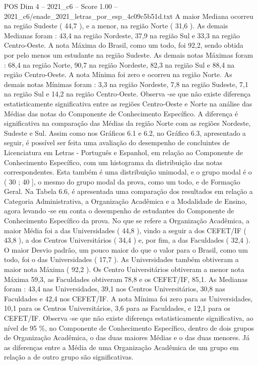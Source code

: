 \begin{textsample}{POS Dim 4 – 2021\_c6 – Score 1.00 – 2021\_c6/enade\_2021\_letras\_por\_esp\_4c09c5b51d.txt}
A maior Mediana ocorreu na região Sudeste ( 44,7 ), e a menor, na região Norte ( 31,6 ).
As demais Medianas foram : 43,4 na região Nordeste, 37,9 na região Sul e 33,3 na região Centro-Oeste.
A nota Máxima do Brasil, como um todo, foi 92,2, sendo obtida por pelo menos um estudante na região Sudeste.
As demais notas Máximas foram : 68,4 na região Norte, 90,7 na região Nordeste, 82,3 na região Sul e 88,4 na região Centro-Oeste.
A nota Mínima foi zero e ocorreu na região Norte.
As demais notas Mínimas foram : 3,3 na região Nordeste, 7,8 na região Sudeste, 7,1 na região Sul e 14,2 na região Centro-Oeste.
Observa -se que não existe diferença estatisticamente significativa entre as regiões Centro-Oeste e Norte na análise das Médias das notas do Componente de Conhecimento Específico.
A diferença é significativa na comparação das Médias da região Norte com as regiões Nordeste, Sudeste e Sul.
Assim como nos Gráficos 6.1 e 6.2, no Gráfico 6.3, apresentado a seguir, é possível ser feita uma avaliação do desempenho de concluintes de Licenciatura em Letras - Português e Espanhol, em relação ao Componente de Conhecimento Específico, com um histograma da distribuição das notas correspondentes.
Esta também é uma distribuição unimodal, e o grupo modal é o ( 30 ; 40 ], o mesmo do grupo modal da prova, como um todo, e de Formação Geral.
Na Tabela 6.6, é apresentada uma comparação dos resultados em relação a Categoria Administrativa, a Organização Acadêmica e a Modalidade de Ensino, agora levando -se em conta o desempenho de estudantes do Componente de Conhecimento Específico da prova.
No que se refere a Organização Acadêmica, a maior Média foi a das Universidades ( 44,8 ), vindo a seguir a dos CEFET/IF ( 43,8 ), a dos Centros Universitários ( 34,4 ) e, por fim, a das Faculdades ( 32,4 ).
O maior Desvio padrão, um pouco maior do que o valor para o Brasil, como um todo, foi o das Universidades ( 17,7 ).
As Universidades também obtiveram a maior nota Máxima ( 92,2 ).
Os Centro Universitários obtiveram a menor nota Máxima 59,3, as Faculdades obtiveram 78,8 e os CEFET/IF, 85,1.
As Medianas foram : 43,4 nas Universidades, 39,1 nos Centros Universitários, 30,8 nas Faculdades e 42,4 nos CEFET/IF.
A nota Mínima foi zero para as Universidades, 10,1 para os Centros Universitários, 3,6 para as Faculdades, e 12,1 para os CEFET/IF.
Observa -se que não existe diferença estatisticamente significativa, ao nível de 95 \%, no Componente de Conhecimento Específico, dentro de dois grupos de Organização Acadêmica, o das duas maiores Médias e o das duas menores.
Já as diferenças entre a Média de uma Organização Acadêmica de um grupo em relação a de outro grupo são significativas.

\end{textsample}
